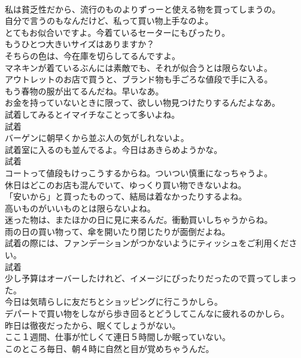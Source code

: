\documentclass[8pt]{extreport}
\begin{document}
\begin{CJK}{UTF8}{min}
\\	私は貧乏性だから、流行のものよりずっーと使える物を買ってしまうの。	
\\	自分で言うのもなんだけど、私って買い物上手なのよ。	
\\	とてもお似合いですよ。今着ているセーターにもぴったり。	
\\	もうひとつ大きいサイズはありますか？	
\\	そちらの色は、今在庫を切らしてるんですよ。	
\\	マネキンが着ているぶんには素敵でも、それが似合うとは限らないよ。	
\\	アウトレットのお店で買うと、ブランド物も手ごろな値段で手に入る。	
\\	もう春物の服が出てるんだね。早いなあ。	
\\	お金を持っていないときに限って、欲しい物見つけたりするんだよなあ。	
\\	試着してみるとイマイチなことって多いよね。	
\\	試着
\\	バーゲンに朝早くから並ぶ人の気がしれないよ。	
\\	試着室に入るのも並んでるよ。今日はあきらめようかな。	
\\	試着
\\	コートって値段もけっこうするからね。ついつい慎重になっちゃうよ。	
\\	休日はどこのお店も混んでいて、ゆっくり買い物できないよね。	
\\	「安いから」と買ったものって、結局は着なかったりするよね。	
\\	高いものがいいものとは限らないよね。	
\\	迷った物は、またほかの日に見に来るんだ。衝動買いしちゃうからね。	
\\	雨の日の買い物って、傘を開いたり閉じたりが面倒だよね。	
\\	試着の際には、ファンデーションがつかないようにティッシュをご利用ください。	
\\	試着
\\	少し予算はオーバーしたけれど、イメージにぴったりだったので買ってしまった。	
\\	今日は気晴らしに友だちとショッピングに行こうかしら。	
\\	デパートで買い物をしながら歩き回るとどうしてこんなに疲れるのかしら。	
\\	昨日は徹夜だったから、眠くてしょうがない。	
\\	ここ１週間、仕事が忙しくて連日５時間しか眠っていない。	
\\	このところ毎日、朝４時に自然と目が覚めちゃうんだ。	

\end{CJK}
\end{document}
